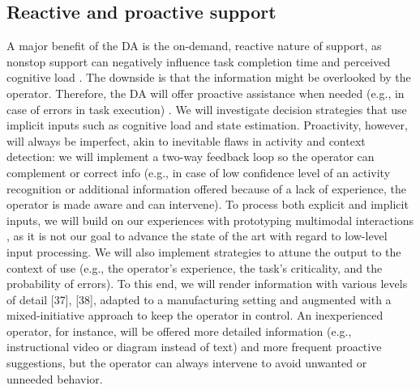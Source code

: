 \subsection{Reactive and proactive support} \label{sec:ReactiveProactive}

A major benefit of the DA is the on-demand, reactive nature of support, as nonstop support can negatively influence task completion time and perceived cognitive load \cite{funk2017WorkingAugmentedReality}. The downside is that the information might be overlooked by the operator. Therefore, the DA will offer proactive assistance when needed (e.g., in case of errors in task execution) \cite{cuenca2016HasseltRapidPrototyping}. We will investigate decision strategies that use implicit inputs such as cognitive load \cite{lindlbauer2019ContextAwareOnlineAdaptation} and state estimation. Proactivity, however, will always be imperfect, akin to inevitable flaws in activity and context detection: we will implement a two-way feedback loop so the operator can complement or correct info (e.g., in case of low confidence level of an activity recognition or additional information offered because of a lack of experience, the operator is made aware and can intervene). To process both explicit and implicit inputs, we will build on our experiences with prototyping multimodal interactions \cite{eshet2016ContextUseFinal}, as it is not our goal to advance the state of the art with regard to low-level input processing. We will also implement strategies to attune the output to the context of use (e.g., the operator's experience, the task's criticality, and the probability of errors). To this end, we will render information with various levels of detail [37], [38], adapted to a manufacturing setting and augmented with a mixed-initiative approach to keep the operator in control. An inexperienced operator, for instance, will be offered more detailed information (e.g., instructional video or diagram instead of text) and more frequent proactive suggestions, but the operator can always intervene to avoid unwanted or unneeded behavior.




